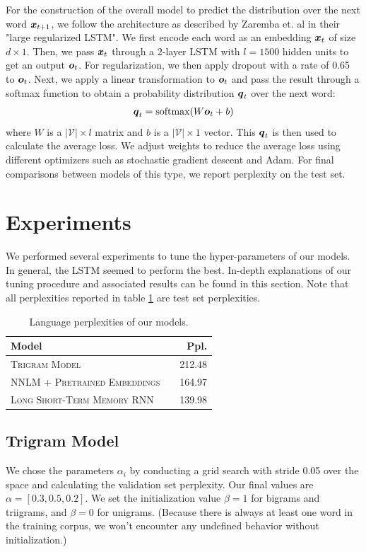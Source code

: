 \documentclass[11pt]{article}
\begin{document}
For the construction of the overall model to predict the distribution over the next word $\boldsymbol{x}_{t+1}$, we follow the architecture as described by Zaremba et. al in their "large regularized LSTM".  We first encode each word as an embedding $\boldsymbol{x}_t$ of size $d \times 1$.  Then, we pass $\boldsymbol{x}_t$ through a 2-layer LSTM with $l =1500$ hidden units to get an output $\boldsymbol{o}_t$.  For regularization, we then apply dropout with a rate of 0.65 to $\boldsymbol{o}_t$.  Next, we apply a linear transformation to $\boldsymbol{o}_t$ and pass the result through a softmax function to obtain a probability distribution $\boldsymbol{q}_t$ over the next word:
\begin{align*}
\boldsymbol{q}_t = \text{softmax} (W \boldsymbol{o}_t + b)
\end{align*} 
where $W$ is a $\lvert \mathcal{V} \rvert \times l$ matrix and $b$ is a $\lvert \mathcal{V} \rvert \times 1$ vector.  This $\boldsymbol{q}_t$ is then used to calculate the average loss.  We adjust weights to reduce the average loss using different optimizers such as stochastic gradient descent and Adam.  For final comparisons between models of this type, we report perplexity on the test set.           


\section{Experiments}

We performed several experiments to tune the hyper-parameters of our models. In general, the LSTM seemed to perform the best. In-depth explanations of our tuning procedure and associated results can be found in this section. Note that all perplexities reported in table \ref{tab:results} are test set perplexities.

\begin{table}[H]
\centering
\begin{tabular}{llr}
 \toprule
 Model &  & Ppl. \\
 \midrule
 \textsc{Trigram Model} & & 212.48 \\
 \textsc{NNLM + Pretrained Embeddings} & & 164.97 \\
 \textsc{Long Short-Term Memory RNN} & & 139.98 \\
 \bottomrule 
\end{tabular}
\caption{\label{tab:results} Language perplexities of our models.}
\end{table}

\subsection{Trigram Model} 
We chose the parameters $\alpha_i$ by conducting a grid search with stride 0.05 over the space and calculating the validation set perplexity. Our final values are $\alpha = [0.3, 0.5, 0.2]$. We set the initialization value $\beta = 1$ for bigrams and triigrams, and $\beta=0$ for unigrams. (Because there is always at least one word in the training corpus, we won't encounter any undefined behavior without initialization.)
\end{document}
